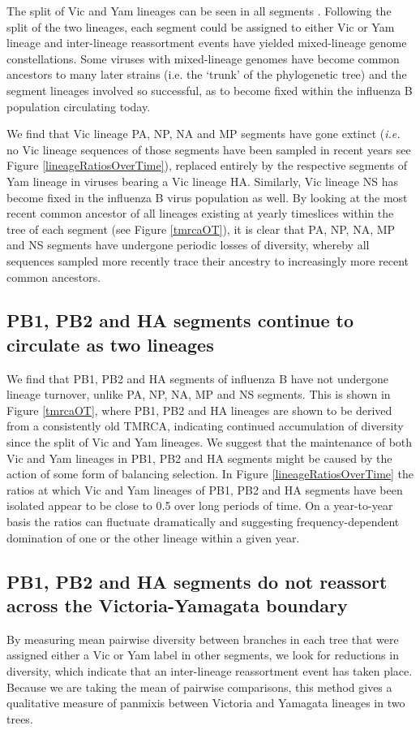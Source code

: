 \documentclass[11pt,oneside,letterpaper]{article}
\begin{document}
The split of Vic and Yam lineages can be seen in all segments \cite{chen2008}.
Following the split of the two lineages, each segment could be assigned to either Vic or Yam lineage and inter-lineage reassortment events have yielded mixed-lineage genome constellations.
Some viruses with mixed-lineage genomes have become common ancestors to many later strains (i.e. the `trunk' of the phylogenetic tree) and the segment lineages involved so successful, as to become fixed within the influenza B population circulating today.

We find that Vic lineage PA, NP, NA and MP segments have gone extinct (\textit{i.e.} no Vic lineage sequences of those segments have been sampled in recent years see Figure \ref{lineageRatiosOverTime}), replaced entirely by the respective segments of Yam lineage in viruses bearing a Vic lineage HA.
Similarly, Vic lineage NS has become fixed in the influenza B virus population as well.
By looking at the most recent common ancestor of all lineages existing at yearly timeslices within the tree of each segment (see Figure \ref{tmrcaOT}), it is clear that PA, NP, NA, MP and NS segments have undergone periodic losses of diversity, whereby all sequences sampled more recently trace their ancestry to increasingly more recent common ancestors.


\subsection*{PB1, PB2 and HA segments continue to circulate as two lineages}
We find that PB1, PB2 and HA segments of influenza B have not undergone lineage turnover, unlike PA, NP, NA, MP and NS segments.
This is shown in Figure \ref{tmrcaOT}, where PB1, PB2 and HA lineages are shown to be derived from a consistently old TMRCA, indicating continued accumulation of diversity since the split of Vic and Yam lineages.
We suggest that the maintenance of both Vic and Yam lineages in PB1, PB2 and HA segments might be caused by the action of some form of balancing selection.
In Figure \ref{lineageRatiosOverTime} the ratios at which Vic and Yam lineages of PB1, PB2 and HA segments have been isolated appear to be close to 0.5 over long periods of time.
On a year-to-year basis the ratios can fluctuate dramatically and suggesting frequency-dependent domination of one or the other lineage within a given year.

\subsection*{PB1, PB2 and HA segments do not reassort across the Victoria-Yamagata boundary}
By measuring mean pairwise diversity between branches in each tree that were assigned either a Vic or Yam label in other segments, we look for reductions in diversity, which indicate that an inter-lineage reassortment event has taken place.
Because we are taking the mean of pairwise comparisons, this method gives a qualitative measure of panmixis between Victoria and Yamagata lineages in two trees.
\end{document}
